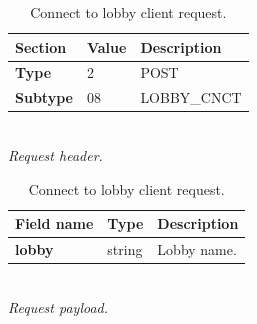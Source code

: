 \documentclass[english, sem, kiv, he, iso690alph, pdf, viewonly]{fasthesis}
\begin{document}
\begin{table}[h!]
	\centering
	\begin{minipage}[b]{0.45\textwidth}
		\centering
		\begin{tabular}{|l|l|l|}
			\hline
			\textbf{Section} & \textbf{Value} & \textbf{Description} \\ \hline
			\textbf{Type} & 2 & \footnotesize{POST} \\ \hline
			\textbf{Subtype} & 08 & \footnotesize{LOBBY\_CNCT}  \\ \hline
		\end{tabular} \\
		\textit{Request header.}
	\end{minipage} 
	\hfill
	\begin{minipage}[b]{0.5\textwidth}
		\centering
		\begin{tabular}{|l|l|p{70pt}|}
			\hline
			\textbf{Field name} & \textbf{Type} & \textbf{Description} \\ \hline
			\textbf{lobby} & string & Lobby name. \\ \hline
		\end{tabular} \\
		\textit{Request payload.}
	\end{minipage}	
	\caption{Connect to lobby client request.}
	\label{tab:connect_lobby_request}
\end{table}
\end{document}

